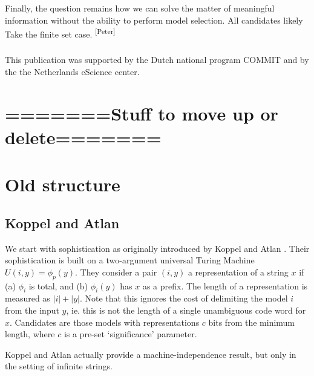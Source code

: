 \documentclass{style/llncs}
\newcommand{\pb}[1]{\textcolor{OliveGreen}{\small #1 \textsuperscript{[Peter]} }}
\begin{document}
Finally, the question remains how we can solve the matter of meaningful information without the ability to perform model selection. \pb{All candidates likely Take the finite set case. }

\subsubsection*{\ackname}

This publication was supported by the Dutch national program COMMIT and by the the Netherlands eScience center.




\appendix

\section{=======Stuff to move up or delete=======}

\section{Old structure}


\subsection{Koppel and Atlan}

We start with sophistication as originally introduced by Koppel and Atlan \cite{koppelSoph1988,koppel1991almost}. Their sophistication is built on a two-argument universal Turing Machine $U(i, y) = \phi_p(y)$. They consider a pair $(i, y)$ a representation of a string $x$ if (a) $\phi_i$ is total, and (b) $\phi_i(y)$ has $x$ as a prefix. The length of a representation is measured as $|i| + |y|$. Note that this ignores the cost of delimiting the model $i$ from the input $y$, ie. this is not the length of a single unambiguous code word for $x$. Candidates are those models with representations $c$ bits from the minimum length, where $c$ is a pre-set `significance' parameter. 

\footnotemark 

Koppel and Atlan actually provide a machine-independence result, but only in the setting of infinite strings. 

\end{document}
